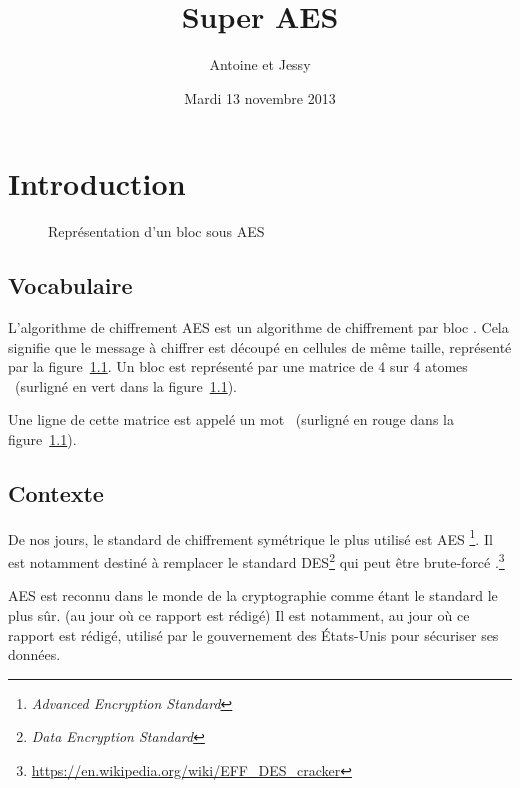 \documentclass[12pt,a4paper]{report}
\title{\og Super AES \fg}
\author{Antoine \bsc{Catton} et Jessy \bsc{Mauclair-Richalet}}
\date{Mardi 13 novembre 2013}
\begin{document}
\maketitle

\tableofcontents

\chapter{Introduction}

\begin{figure}[h!]
\centering
{}
\label{fig:aesbloc}
\caption{Représentation d'un bloc sous AES}
\end{figure}

\section{Vocabulaire}

L'algorithme de chiffrement AES est un algorithme de chiffrement \og par bloc
\fg.  Cela signifie que le message à chiffrer est découpé en cellules de même
taille, représenté par la figure~\ref{fig:aesbloc}. Un bloc est représenté par
une matrice de 4 sur 4 \og atomes \fg\ (surligné en vert dans la
figure~\ref{fig:aesbloc}).

Une ligne de cette matrice est appelé un \og mot \fg\ (surligné en rouge dans
la figure~\ref{fig:aesbloc}).

\section{Contexte}

De nos jours, le standard de chiffrement symétrique le plus utilisé est AES
\footnote{\emph{Advanced Encryption Standard}}.  Il est notamment destiné à remplacer le
standard DES\footnote{\emph{Data Encryption Standard}} qui peut être
\og brute-forcé \fg.\footnote{\url{https://en.wikipedia.org/wiki/EFF_DES_cracker}}

AES est reconnu dans le monde de la cryptographie comme étant le standard le plus sûr.
(au jour où ce rapport est rédigé) Il est notamment, au jour où ce rapport est rédigé,
utilisé par le gouvernement des États-Unis pour sécuriser ses données.
\end{document}
